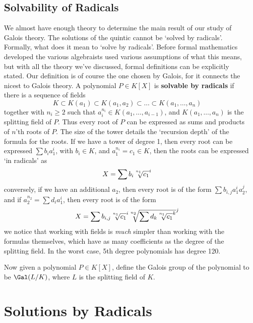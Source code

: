 \section{Solvability of Radicals}

We almost have enough theory to determine the main result of our study of Galois theory. The solutions of the quintic cannot be `solved by radicals'. Formally, what does it mean to `solve by radicals'. Before formal mathematics developed the various algebraists used various assumptions of what this means, but with all the theory we've discussed, formal definitions can be explicitly stated. Our definition is of course the one chosen by Galois, for it connects the nicest to Galois theory. A polynomial $P \in K[X]$ is {\bf solvable by radicals} if there is a sequence of fields
%
\[ K \subset K(a_1) \subset K(a_1, a_2) \subset \dots \subset K(a_1, \dots, a_n) \]
%
together with $n_i \geq 2$ such that $a_i^{n_i} \in K(a_1, \dots, a_{i-1})$, and $K(a_1, \dots, a_n)$ is the splitting field of $P$. Thus every root of $P$ can be expressed as sums and products of $n$'th roots of $P$. The size of the tower details the `recursion depth' of the formula for the roots. If we have a tower of degree 1, then every root can be expressed $\sum b_i a_1^i$, with $b_i \in K$, and $a_1^{n_i} = c_1 \in K$, then the roots can be expressed `in radicals' as
%
\[ X = \sum b_i \sqrt[\uproot{5}n_1]{c_1}^i \]
%
conversely, if we have an additional $a_2$, then every root is of the form $\sum b_{i,j} a_1^i a_2^j$, and if $a_2^{n_2} = \sum d_i a_1^i$, then every root is of the form
%
\[ X = \sum b_{i,j} \sqrt[\uproot{5}n_1]{c_1}^i \sqrt[\uproot{5}n_2]{\sum d_k \sqrt[\uproot{5}n_1]{c_1}^k}^j \]
%
we notice that working with fields is {\it much} simpler than working with the formulas themselves, which have as many coefficients as the degree of the splitting field. In the worst case, 5th degree polynomials has degree 120.

Now given a polynomial $P \in K[X]$, define the Galois group of the polynomial to be $\Gal(L/K)$, where $L$ is the splitting field of $K$.












\chapter{Solutions by Radicals}

